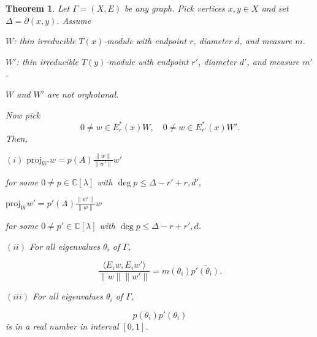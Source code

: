 \documentclass[
]{book}
\newtheorem{theorem}{Theorem}[chapter]
\theoremstyle{definition}
\theoremstyle{definition}
\theoremstyle{definition}
\theoremstyle{definition}
\theoremstyle{remark}
\begin{document}
\begin{theorem}
\protect\hypertarget{thm:two-thin-modules}{}\label{thm:two-thin-modules}Let \(\Gamma = (X,E)\) be any graph. Pick vertices \(x,y\in X\) and set \(\Delta = \partial(x,y)\). Assume

\(W\): thin irreducible \(T(x)\)-module with endpoint \(r\), diameter \(d\), and measure \(m\).

\(W'\): thin irreducible \(T(y)\)-module with endpoint \(r'\), diameter \(d'\), and measure \(m'\).

\(W\) and \(W'\) are not orghotonal.

Now pick
\[0\neq w\in E^*_r(x)W, \quad 0\neq w\in E^*_{r'}(x)W'.\]
Then,

\((i)\) \({\displaystyle \mathrm{proj}_{W'}w = p(A)\frac{\|w\|}{\|w'\|}w'}\)

for some \(0\neq p\in \mathbb{C}[\lambda]\) with \(\deg p \leq \Delta - r' + r, d'\),

\({\displaystyle \mathrm{proj}_{W}w' = p'(A)\frac{\|w'\|}{\|w\|}w}\)

for some \(0\neq p'\in \mathbb{C}[\lambda]\) with \(\deg p \leq \Delta - r + r', d\).

\((ii)\) For all eigenvalues \(\theta_i\) of \(\Gamma\),

\[\frac{\langle E_iw, E_iw'\rangle}{\|w\|\|w'\|} = m(\theta_i)\overline{p'(\theta_i)}.\]

\((iii)\) For all eigenvalues \(\theta_i\) of \(\Gamma\),

\[p(\theta_i)p'(\theta_i)\]
is in a real number in interval \([0,1]\).
\end{theorem}
\end{document}
